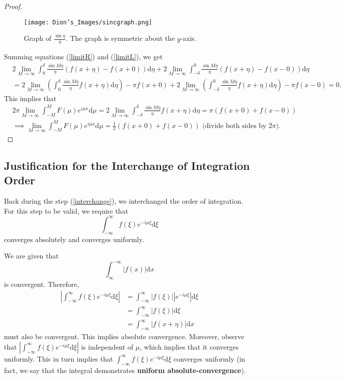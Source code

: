 \begin{proof}
\begin{figure}[h]
\centering
\texttt{[image: Dion's\_Images/sincgraph.png]}
\caption{Graph of $\frac{\sin \eta}{\eta}$. The graph is symmetric about the $y$-axis.}
\label{sinc}
\end{figure}

Summing equations (\ref{limitR}) and (\ref{limitL}), we get
\begin{align*}
&2\lim_{M\rightarrow\infty} \int_{0}^{\delta}\frac{\sin M \eta}{\eta}(f(x + \eta) - f(x+0))\mathrm{d}\eta + 2\lim_{M\rightarrow\infty} \int_{-\delta}^{0}\frac{\sin M \eta}{\eta}(f(x + \eta) - f(x-0))\mathrm{d}\eta \\
&= 2\lim_{M\rightarrow\infty}\left(\int_{0}^{\delta}\frac{\sin M \eta}{\eta}f(x + \eta)\mathrm{d}\eta\right) - \pi f(x+0) + 2\lim_{M\rightarrow\infty}\left(\int_{-\delta}^{0}\frac{\sin M \eta}{\eta}f(x + \eta)\mathrm{d}\eta\right) - \pi f(x-0) = 0.
\end{align*}
This implies that
\begin{align*}
&2\pi\lim_{M\rightarrow\infty}\int_{-M}^{M}F(\mu)e^{i\mu x}\mathrm{d}\mu = 2\lim_{M\rightarrow\infty}\int_{-\delta}^{\delta}\frac{\sin M \eta}{\eta}f(x + \eta)\mathrm{d}\eta = \pi(f(x+0) + f(x-0)) \\
&\implies \lim_{M\rightarrow\infty}\int_{-M}^{M}F(\mu)e^{i\mu x}\mathrm{d}\mu = \frac{1}{2}(f(x+0) + f(x-0)) \mbox{ (divide both sides by $2\pi$)}.
\end{align*}
\end{proof}

\subsection{Justification for the Interchange of Integration Order} \label{justification}
Back during the step (\ref{interchange}), we interchanged the order of integration. For this step to be valid, we require that
$$\int_{-\infty}^{\infty}f(\xi)e^{-i\mu\xi}\mathrm{d}\xi$$ converges absolutely and converges uniformly.

We are given that
$$\int_\infty^{-\infty}|f(x)|\mathrm{d}x$$ 
is convergent. Therefore,
\begin{align*}
\left|\int_{-\infty}^{\infty}f(\xi)e^{-i\mu\xi}\mathrm{d}\xi\right| &= \int_{-\infty}^{\infty}|f(\xi)| |e^{-i\mu\xi}|\mathrm{d}\xi \\
&= \int_{-\infty}^{\infty}|f(\xi)| \mathrm{d}\xi \\
&= \int_{-\infty}^{\infty}|f(x+\eta)| \mathrm{d}x
\end{align*}
must also be convergent. This implies absolute convergence. Moreover, observe that 
$\left|\int_{-\infty}^{\infty}f(\xi)e^{-i\mu\xi}\mathrm{d}\xi\right|$ is independent of $\mu$, 
which implies that it converges uniformly.
This in turn implies that $\int_{-\infty}^{\infty}f(\xi)e^{-i\mu\xi}\mathrm{d}\xi$ converges uniformly (in fact, we say that the integral demonstrates \textbf{uniform absolute-convergence}).

